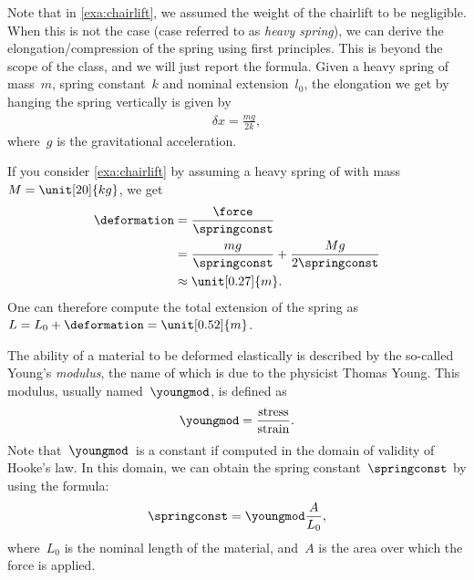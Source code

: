     Note that in \cref{exa:chairlift}, we assumed the weight of the chairlift to be negligible.
    When this is not the case (case referred to as \emph{heavy spring}), we can derive the elongation/compression of the spring using first principles.
    This is beyond the scope of the class, and we will just report the formula.
    Given a heavy spring of mass~$m$, spring constant~$k$ and nominal extension~$l_0$, the elongation we get by hanging the spring vertically is given by
    \begin{equation}
        \begin{aligned}
            \delta x =\frac{m g}{2k},
        \end{aligned}
    \end{equation}
    where~$g$ is the gravitational acceleration.

    \begin{example}
        If you consider \cref{exa:chairlift} by assuming a heavy spring of with mass~$M=\unit[20]{kg}$, we get
        \begin{equation}
            \begin{aligned}
                \deformation & =\frac{\force}{\springconst} \\
                             & =\frac{mg}{\springconst}+\frac{Mg}{2\springconst} \\
                             & \approx \unit[0.27]{m}.
            \end{aligned}
        \end{equation}
        One can therefore compute the total extension of the spring as~$L=L_0+\deformation=\unit[0.52]{m}$.
    \end{example}

    The ability of a material to be deformed elastically is described by the so-called Young's \emph{modulus}, the name of which is due to the physicist Thomas Young.
    This modulus, usually named~$\youngmod$, is defined as
    \begin{equation}
        \youngmod=\frac{\text{stress}}{\text{strain}}.
    \end{equation}
    Note that~$\youngmod$~is a constant if computed in the domain of validity of Hooke's law.
    In this domain, we can obtain the spring constant~$\springconst$ by using the formula:
    \begin{equation}
        \springconst=\youngmod \frac{A}{L_0},
    \end{equation}
    where~$L_0$ is the nominal length of the material, and~$A$ is the area over which the force is applied.


